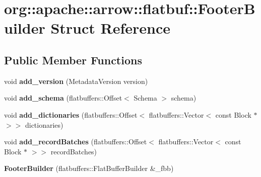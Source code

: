 \hypertarget{structorg_1_1apache_1_1arrow_1_1flatbuf_1_1FooterBuilder}{}\section{org\+:\+:apache\+:\+:arrow\+:\+:flatbuf\+:\+:Footer\+Builder Struct Reference}
\label{structorg_1_1apache_1_1arrow_1_1flatbuf_1_1FooterBuilder}
\subsection*{Public Member Functions}
\begin{DoxyCompactItemize}
\item 
void {\bfseries add\+\_\+version} (Metadata\+Version version)\hypertarget{structorg_1_1apache_1_1arrow_1_1flatbuf_1_1FooterBuilder_a0e988e3ddb8f0e7285bf866abe409c27}{}\label{structorg_1_1apache_1_1arrow_1_1flatbuf_1_1FooterBuilder_a0e988e3ddb8f0e7285bf866abe409c27}

\item 
void {\bfseries add\+\_\+schema} (flatbuffers\+::\+Offset$<$ Schema $>$ schema)\hypertarget{structorg_1_1apache_1_1arrow_1_1flatbuf_1_1FooterBuilder_a8a0a28c8f537f8f06e6e9c26a6e606c3}{}\label{structorg_1_1apache_1_1arrow_1_1flatbuf_1_1FooterBuilder_a8a0a28c8f537f8f06e6e9c26a6e606c3}

\item 
void {\bfseries add\+\_\+dictionaries} (flatbuffers\+::\+Offset$<$ flatbuffers\+::\+Vector$<$ const Block $\ast$ $>$$>$ dictionaries)\hypertarget{structorg_1_1apache_1_1arrow_1_1flatbuf_1_1FooterBuilder_ae729035e7d3966577e9aac01b896d897}{}\label{structorg_1_1apache_1_1arrow_1_1flatbuf_1_1FooterBuilder_ae729035e7d3966577e9aac01b896d897}

\item 
void {\bfseries add\+\_\+record\+Batches} (flatbuffers\+::\+Offset$<$ flatbuffers\+::\+Vector$<$ const Block $\ast$ $>$$>$ record\+Batches)\hypertarget{structorg_1_1apache_1_1arrow_1_1flatbuf_1_1FooterBuilder_abcd9939a403ec9d38c3a31d3c63b0693}{}\label{structorg_1_1apache_1_1arrow_1_1flatbuf_1_1FooterBuilder_abcd9939a403ec9d38c3a31d3c63b0693}

\item 
{\bfseries Footer\+Builder} (flatbuffers\+::\+Flat\+Buffer\+Builder \&\+\_\+fbb)\hypertarget{structorg_1_1apache_1_1arrow_1_1flatbuf_1_1FooterBuilder_a6875805a47ddd121bd6a0b948c4945f4}{}\label{structorg_1_1apache_1_1arrow_1_1flatbuf_1_1FooterBuilder_a6875805a47ddd121bd6a0b948c4945f4}


\end{DoxyCompactItemize}
